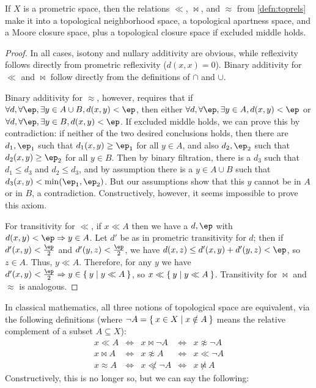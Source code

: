 \documentclass{article}
\def\napprox{\not\approx}
\def\cpl#1{\neg #1}
\let\implies\Rightarrow
\def\hfep{\frac{\ep}{2}}
\begin{document}
\begin{thm}
  If $X$ is a prometric space, then the relations $\ll$, $\bowtie$, and $\approx$ from \cref{defn:toprels} make it into a topological neighborhood space, a topological apartness space, and a Moore closure space, plus a topological closure space if excluded middle holds.
\end{thm}
\begin{proof}
  In all cases, isotony and nullary additivity are obvious, while reflexivity follows directly from prometric reflexivity ($d(x,x)=0$).
  Binary additivity for $\ll$ and $\bowtie$ follow directly from the definitions of $\cap$ and $\cup$.

  Binary additivity for $\approx$, however, requires that if $\forall d,\forall \ep, \exists y\in A\cup B, d(x,y)<\ep$, then either $\forall d,\forall \ep, \exists y\in A, d(x,y)<\ep$ or $\forall d,\forall \ep, \exists y\in B, d(x,y)<\ep$.
  If excluded middle holds, we can prove this by contradiction: if neither of the two desired conclusions holds, then there are $d_1,\ep_1$ such that $d_1(x,y)\ge \ep_1$ for all $y\in A$, and also $d_2,\ep_2$ such that $d_2(x,y)\ge\ep_2$ for all $y\in B$.
  Then by binary filtration, there is a $d_3$ such that $d_1\le d_3$ and $d_2\le d_3$, and by assumption there is a $y\in A\cup B$ such that $d_3(x,y)<\min(\ep_1,\ep_2)$.
  But our assumptions show that this $y$ cannot be in $A$ or in $B$, a contradiction.
  Constructively, however, it seems impossible to prove this axiom.

  For transitivity for $\ll$, if $x\ll A$ then we have a $d,\ep$ with $d(x,y)<\ep \implies y\in A$.
  Let $d'$ be as in prometric transitivity for $d$; then if $d'(x,y)<\hfep$ and $d'(y,z)<\hfep$, we have $d(x,z) \le d'(x,y)+d'(y,z) <\ep$, so $z\in A$.
  Thus, $y\ll A$.
  Therefore, for any $y$ we have $d'(x,y)<\hfep \implies y\in \setof{ y | y\ll A }$, so $x\ll \Set{ y | y\ll A }$.
  Transitivity for $\bowtie$ and $\approx$ is analogous.
\end{proof}

In classical mathematics, all three notions of topological space are equivalent, via the following definitions (where $\cpl{A} = \setof{x\in X | x\notin A}$ means the relative complement of a subset $A\subseteq X$):
\[
\begin{array}{ccccc}
  x\ll A & \iff & x \bowtie \cpl{A} & \iff & x\napprox \cpl{A}\\
  x\bowtie A & \iff & x\napprox A & \iff & x \ll \cpl{A}\\
  x\approx A & \iff & x \not\ll \cpl{A} & \iff & x \not\bowtie A
\end{array}
\]
Constructively, this is no longer so, but we can say the following:
\end{document}
